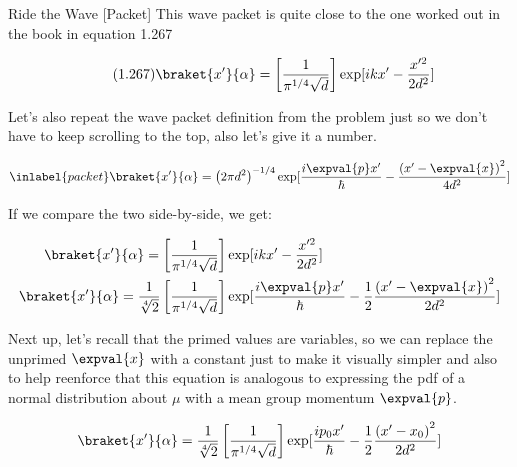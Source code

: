 \begin{answer}
  \begin{answerpart}{Ride the Wave [Packet]}
    This wave packet is quite close to the one worked out in the book
    in equation 1.267

    \begin{equation}
      \tag{1.267}
      \braket{x'}{\alpha} = \left[\frac{1}{\pi^{1/4}\sqrt{d}}\right]
      \exp[
        ikx'
        -  \frac{x'^2}{2d^2}
        ]
    \end{equation}

    Let's also repeat the wave packet definition from the problem just
    so we don't have to keep scrolling to the top, also let's give it
    a number.

    \begin{equation}
      \inlabel{packet}
      \braket{x'}{\alpha} = \left(2 \pi d^2\right)^{-1/4}
      \exp[
        \frac{i\expval{p}x'}{\hbar}
        -  \frac{\left(x' - \expval{x}\right)^2}{4d^2}
        ]
    \end{equation}
    
    If we compare the two side-by-side, we get:
    
    \begin{equation}
      \begin{split}
      \braket{x'}{\alpha} = \left[\frac{1}{\pi^{1/4}\sqrt{d}}\right]
      &\exp[
        ikx'
        -  \frac{x'^2}{2d^2}
        ]\\
      \braket{x'}{\alpha} =
      \frac{1}{\sqrt[4]{2}}
      \left[
        \frac{1}{\pi^{1/4}\sqrt{d}}\right]
      &\exp[
        \frac{i\expval{p}x'}{\hbar}
        -  \frac{1}{2}\frac{\left(x' - \expval{x}\right)^2}{2d^2}
        ]\\
      \end{split}
    \end{equation}

    Next up, let's recall that the primed values are variables, so we
    can replace the unprimed $\expval{x}$ with a constant just to make
    it visually simpler and also to help reenforce that this equation
    is analogous to expressing the \ac{pdf} of a normal distribution
    about $\mu$ with a mean group momentum $\expval{p}$.

    \begin{equation}
      \braket{x'}{\alpha} =
      \frac{1}{\sqrt[4]{2}}
      \left[
        \frac{1}{\pi^{1/4}\sqrt{d}}\right]
      \exp[
        \frac{ip_0x'}{\hbar}
        -  \frac{1}{2}\frac{\left(x' - x_0\right)^2}{2d^2}
        ]
    \end{equation}


\end{answerpart}
\end{answer}
